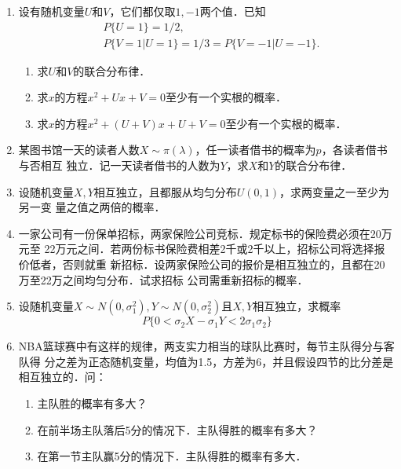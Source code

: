 \documentclass[10pt,a4paper]{article}
\begin{document}
\begin{enumerate}
    \item 设有随机变量$U$和$V$，它们都仅取$1,-1$两个值．已知
    \begin{equation}
        \begin{split}
            & P\{U=1\}=1/2,\\
            & P\{V=1|U=1\}=1/3=P\{V=-1|U=-1\}.
        \end{split}
        \nonumber
    \end{equation}
    \begin{enumerate}
        \item 求$U$和$V$的联合分布律．
        \item 求$x$的方程$x^2+Ux+V=0$至少有一个实根的概率．
        \item 求$x$的方程$x^2+(U+V)x+U+V=0$至少有一个实根的概率．
    \end{enumerate}




    \item 某图书馆一天的读者人数$X\sim \pi(\lambda)$，任一读者借书的概率为$p$，各读者借书与否相互
    独立．记一天读者借书的人数为$Y$，求$X$和$Y$的联合分布律．




    \item 设随机变量$X,Y$相互独立，且都服从均匀分布$U(0,1)$，求两变量之一至少为另一变
    量之值之两倍的概率．



    \item 一家公司有一份保单招标，两家保险公司竞标．规定标书的保险费必须在20万元至
    22万元之间．若两份标书保险费相差2千或2千以上，招标公司将选择报价低者，否则就重
    新招标．设两家保险公司的报价是相互独立的，且都在20万至22万之间均匀分布．试求招标
    公司需重新招标的概率．



    \item 设随机变量$X\sim N(0,\sigma_1^2),Y\sim N(0,\sigma_2^2)$且$X,Y$相互独立，求概率
    $$P\{0<\sigma_2 X -\sigma_1 Y<2\sigma_1\sigma_2\}$$




    \item NBA篮球赛中有这样的规律，两支实力相当的球队比赛时，每节主队得分与客队得
    分之差为正态随机变量，均值为1.5，方差为6，并且假设四节的比分差是相互独立的．问：
    \begin{enumerate}
        \item 主队胜的概率有多大？
        \item 在前半场主队落后5分的情况下．主队得胜的概率有多大？
        \item 在第一节主队赢5分的情况下．主队得胜的概率有多大．
    \end{enumerate}





\end{enumerate}
\end{document}
